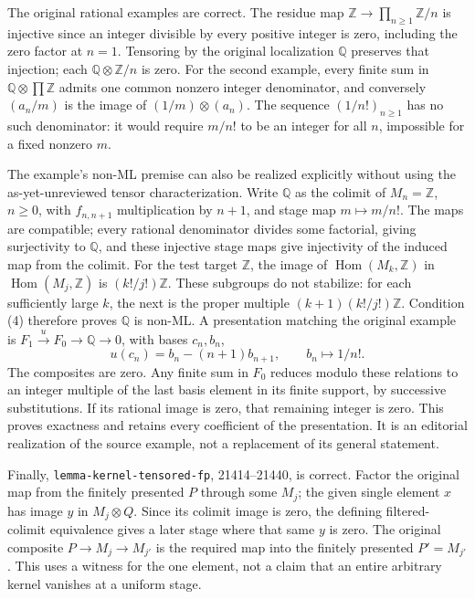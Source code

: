 The original rational examples are correct. The residue map \(\mathbb Z\to\prod_{n\geq1}\mathbb Z/n\) is injective since an integer divisible by every positive integer is zero, including the zero factor at \(n=1\). Tensoring by the original localization \(\mathbb Q\) preserves that injection; each \(\mathbb Q\otimes\mathbb Z/n\) is zero. For the second example, every finite sum in \(\mathbb Q\otimes\prod\mathbb Z\) admits one common nonzero integer denominator, and conversely \((a_n/m)\) is the image of \((1/m)\otimes(a_n)\). The sequence \((1/n!)_{n\geq1}\) has no such denominator: it would require \(m/n!\) to be an integer for all \(n\), impossible for a fixed nonzero \(m\).

The example's non-ML premise can also be realized explicitly without using the as-yet-unreviewed tensor characterization. Write \(\mathbb Q\) as the colimit of \(M_n=\mathbb Z\), \(n\geq0\), with \(f_{n,n+1}\) multiplication by \(n+1\), and stage map \(m\mapsto m/n!\). The maps are compatible; every rational denominator divides some factorial, giving surjectivity to \(\mathbb Q\), and these injective stage maps give injectivity of the induced map from the colimit. For the test target \(\mathbb Z\), the image of \(\operatorname{Hom}(M_k,\mathbb Z)\) in \(\operatorname{Hom}(M_j,\mathbb Z)\) is \((k!/j!)\mathbb Z\). These subgroups do not stabilize: for each sufficiently large \(k\), the next is the proper multiple \((k+1)(k!/j!)\mathbb Z\). Condition (4) therefore proves \(\mathbb Q\) is non-ML. A presentation matching the original example is \(F_1\xrightarrow{u}F_0\to\mathbb Q\to0\), with bases \(c_n,b_n\), \[
u(c_n)=b_n-(n+1)b_{n+1},\qquad b_n\longmapsto1/n!.
\] The composites are zero. Any finite sum in \(F_0\) reduces modulo these relations to an integer multiple of the last basis element in its finite support, by successive substitutions. If its rational image is zero, that remaining integer is zero. This proves exactness and retains every coefficient of the presentation. It is an editorial realization of the source example, not a replacement of its general statement.

Finally, \texttt{lemma-\AlgebraIdentifierBreak{}kernel-\AlgebraIdentifierBreak{}tensored-\AlgebraIdentifierBreak{}fp}, 21414--21440, is correct. Factor the original map from the finitely presented \(P\) through some \(M_j\); the given single element \(x\) has image \(y\) in \(M_j\otimes Q\). Since its colimit image is zero, the defining filtered-colimit equivalence gives a later stage where that same \(y\) is zero. The original composite \(P\to M_j\to M_{j'}\) is the required map into the finitely presented \(P'=M_{j'}\). This uses a witness for the one element, not a claim that an entire arbitrary kernel vanishes at a uniform stage.

